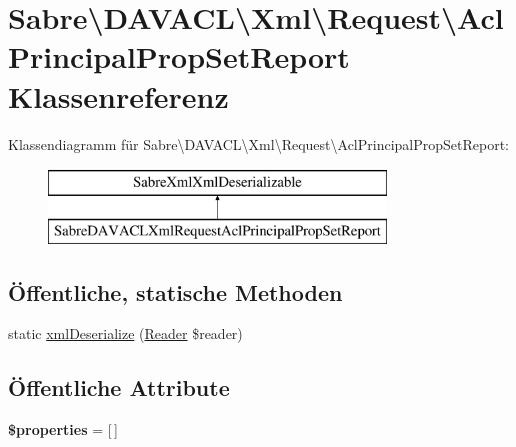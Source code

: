 \hypertarget{class_sabre_1_1_d_a_v_a_c_l_1_1_xml_1_1_request_1_1_acl_principal_prop_set_report}{}\section{Sabre\textbackslash{}D\+A\+V\+A\+CL\textbackslash{}Xml\textbackslash{}Request\textbackslash{}Acl\+Principal\+Prop\+Set\+Report Klassenreferenz}
\label{class_sabre_1_1_d_a_v_a_c_l_1_1_xml_1_1_request_1_1_acl_principal_prop_set_report}
Klassendiagramm für Sabre\textbackslash{}D\+A\+V\+A\+CL\textbackslash{}Xml\textbackslash{}Request\textbackslash{}Acl\+Principal\+Prop\+Set\+Report\+:\begin{figure}[H]
\begin{center}
\leavevmode
\includegraphics[height=2.000000cm]{class_sabre_1_1_d_a_v_a_c_l_1_1_xml_1_1_request_1_1_acl_principal_prop_set_report}
\end{center}
\end{figure}
\subsection*{Öffentliche, statische Methoden}
\begin{DoxyCompactItemize}
\item 
static \mbox{\hyperlink{class_sabre_1_1_d_a_v_a_c_l_1_1_xml_1_1_request_1_1_acl_principal_prop_set_report_a0e9ad784558bd4c3b60dfadf35c3bb8e}{xml\+Deserialize}} (\mbox{\hyperlink{class_sabre_1_1_xml_1_1_reader}{Reader}} \$reader)
\end{DoxyCompactItemize}
\subsection*{Öffentliche Attribute}
\begin{DoxyCompactItemize}
\item 
\mbox{\label{class_sabre_1_1_d_a_v_a_c_l_1_1_xml_1_1_request_1_1_acl_principal_prop_set_report_a151656b88341f349854d3839234f6399}} 
{\bfseries \$properties} = \mbox{[}$\,$\mbox{]}
\end{DoxyCompactItemize}


